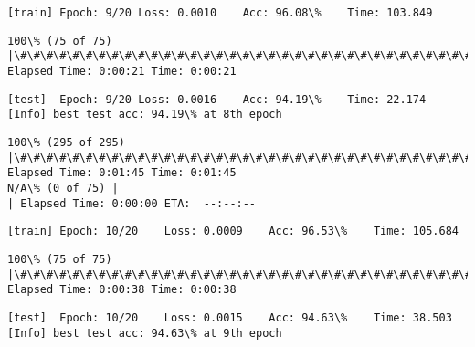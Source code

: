 \documentclass[11pt]{article}
\begin{document}
    \begin{Verbatim}[commandchars=\\\{\}]
[train]	Epoch: 9/20	Loss: 0.0010	Acc: 96.08\%	Time: 103.849

    \end{Verbatim}

    \begin{Verbatim}[commandchars=\\\{\}]
100\% (75 of 75) |\#\#\#\#\#\#\#\#\#\#\#\#\#\#\#\#\#\#\#\#\#\#\#\#\#\#\#\#\#\#\#\#\#\#\#\#\#\#\#\#\#\#\#\#\#\#\#\#\#\#\#\#\#\#\#\#\#\#\#\#\#\#\#\#\#| Elapsed Time: 0:00:21 Time: 0:00:21

    \end{Verbatim}

    \begin{Verbatim}[commandchars=\\\{\}]
[test]	Epoch: 9/20	Loss: 0.0016	Acc: 94.19\%	Time: 22.174
[Info] best test acc: 94.19\% at 8th epoch

    \end{Verbatim}

    \begin{Verbatim}[commandchars=\\\{\}]
100\% (295 of 295) |\#\#\#\#\#\#\#\#\#\#\#\#\#\#\#\#\#\#\#\#\#\#\#\#\#\#\#\#\#\#\#\#\#\#\#\#\#\#\#\#\#\#\#\#\#\#\#\#\#\#\#\#\#\#\#\#\#\#\#\#\#\#\#| Elapsed Time: 0:01:45 Time: 0:01:45
N/A\% (0 of 75) |                                                                 | Elapsed Time: 0:00:00 ETA:  --:--:--
    \end{Verbatim}

    \begin{Verbatim}[commandchars=\\\{\}]
[train]	Epoch: 10/20	Loss: 0.0009	Acc: 96.53\%	Time: 105.684

    \end{Verbatim}

    \begin{Verbatim}[commandchars=\\\{\}]
100\% (75 of 75) |\#\#\#\#\#\#\#\#\#\#\#\#\#\#\#\#\#\#\#\#\#\#\#\#\#\#\#\#\#\#\#\#\#\#\#\#\#\#\#\#\#\#\#\#\#\#\#\#\#\#\#\#\#\#\#\#\#\#\#\#\#\#\#\#\#| Elapsed Time: 0:00:38 Time: 0:00:38

    \end{Verbatim}

    \begin{Verbatim}[commandchars=\\\{\}]
[test]	Epoch: 10/20	Loss: 0.0015	Acc: 94.63\%	Time: 38.503
[Info] best test acc: 94.63\% at 9th epoch

    \end{Verbatim}
\end{document}
